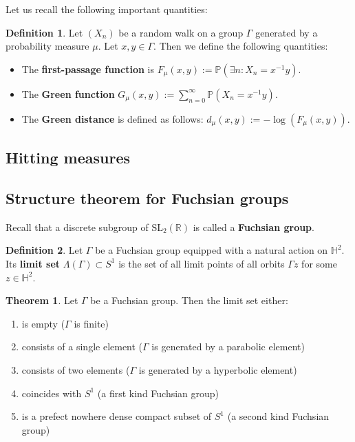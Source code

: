 \documentclass[11pt]{amsart}
\theoremstyle{definition}
\newtheorem{definition}{Definition}[section]
\newtheorem{theorem}{Theorem}[section]
\begin{document}
			Let us recall the following important quantities:
			\begin{definition}
				Let $(X_n)$ be a random walk on a group $\Gamma$ generated by a probability measure $\mu$. Let $x, y \in \Gamma$. Then we define the following quantities:
				\begin{itemize}
					\item The \textbf{first-passage function} is $F_\mu(x, y) := \mathbb{P}(\exists n : X_n = x^{-1} y)$.
					\item The \textbf{Green function} $G_\mu(x, y) := \sum_{n=0}^{\infty} \mathbb{P}(X_n = x^{-1} y)$.
					\item The \textbf{Green distance} is defined as follows: $d_\mu(x, y) := - \log(F_\mu(x, y))$.
				\end{itemize} 
			\end{definition}
			
		\subsection{Hitting measures}
		
		\subsection{Structure theorem for Fuchsian groups}
		Recall that a discrete subgroup of $\text{SL}_2(\mathbb{R})$ is called a \textbf{Fuchsian group}.
		
		\begin{definition}
			Let $\Gamma$ be a Fuchsian group equipped with a natural action on $\mathbb{H}^2$. Its \textbf{limit set} $\Lambda(\Gamma) \subset S^1$ is the set of all limit points of all orbits $\Gamma z$ for some $z \in \mathbb{H}^2$. 
		\end{definition}
		\begin{theorem}
			\label{classification of Fuchsian}
			Let $\Gamma$ be a Fuchsian group. Then the limit set either:
			\begin{enumerate}
				\item is empty ($\Gamma$ is finite)
				\item consists of a single element ($\Gamma$ is generated by a parabolic element)
				\item consists of two elements ($\Gamma$ is generated by a hyperbolic element)
				\item coincides with $S^1$ (a first kind Fuchsian group)
				\item is a prefect nowhere dense compact subset of $S^1$ (a second kind Fuchsian group) 
			\end{enumerate}
		\end{theorem}
		
\end{document}
